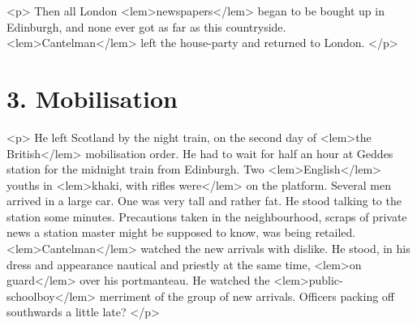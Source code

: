 				<p>
					Then all London 
<lem>newspapers</lem>{} began to be bought up in Edinburgh, and none ever got as far 
					as this countryside. 
<lem>Cantelman</lem>{} left the house-party and returned to London. 
				</p>

\newpage %

	\section*{3. Mobilisation}

				<p>
					He left Scotland by the night train, on the second day of 
<lem>the British</lem>
						{} 
					mobilisation order. 
					He had to wait for half an hour at Geddes station for the midnight train from Edinburgh. 
					Two 
<lem>English</lem>{} youths in 
<lem>khaki, with rifles were</lem>
						{} 
					on the platform. Several men arrived in 
					a large car. One was very tall and rather fat. He stood talking to the station 
						{} 
					some minutes. Precautions taken in the neighbourhood, 
					scraps of private news a station master might be supposed to know, was being 
					retailed. 
<lem>Cantelman</lem>
						{} 
					watched the new arrivals with dislike. He stood, in his dress and 
					appearance nautical and priestly at the same time, 
<lem>on guard</lem>
						{} 
					over his portmanteau. 
					He watched the 
<lem>public-schoolboy</lem>
						{} 
					merriment of the group of new arrivals. Officers 
					packing off southwards a little late? 
 				</p>

